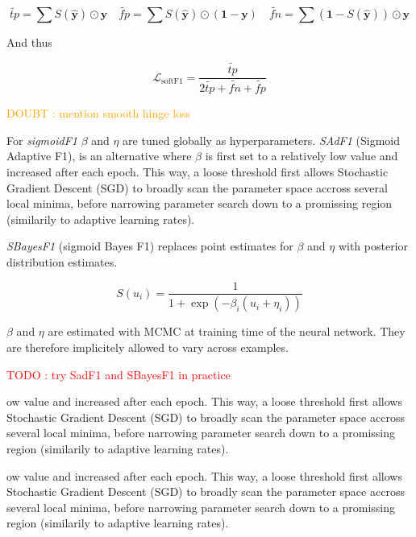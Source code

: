 \documentclass[sigconf,natbib,screen=true,review=true,anonymous]{acmart}
\newcommand\todo[1]{\textcolor{red}{TODO : #1}}
\newcommand\doubt[1]{\textcolor{orange}{DOUBT : #1}}
\begin{document}
$$
\widetilde{tp}=\sum S(\hat{\mathbf{y}}) \odot \mathbf{y} \quad\widetilde{fp}= \sum S(\hat{\mathbf{y}}) \odot (\mathbf{1} - \mathbf{y}) \quad \widetilde{f n}= \sum (\mathbf{1} - S(\hat{\mathbf{y}})) \odot \mathbf{y}
$$

And thus

\begin{equation}
\mathcal{L}_{\text {softF1}}= \frac{\widetilde{tp}}{2 \widetilde{tp}+ \widetilde{fn}+ \widetilde{fp}}
\end{equation}

\doubt{mention smooth hinge loss} \cite{smoothHinge}

For \emph{sigmoidF1} \(\beta\) and \(\eta\) are tuned globally as hyperparameters. \emph{SAdF1} (Sigmoid Adaptive F1), is an alternative where \(\beta\) is first set to a relatively low value and increased after each epoch. This way, a loose threshold first allows Stochastic Gradient Descent (SGD) to broadly scan the parameter space accross several local minima, before narrowing parameter search down to a promissing region (similarily to adaptive learning rates).

\emph{SBayesF1} (sigmoid Bayes F1) replaces point estimates for \(\beta\) and \(\eta\) with posterior distribution estimates. 

\begin{equation}
S(u_i) = \frac{1}{1+\exp (-\beta_i (u_i + \eta_i))}
\end{equation}



\(\beta\) and \(\eta\) are estimated with MCMC at training time of the neural network. They are therefore implicitely allowed to vary across examples.

\todo{try SadF1 and SBayesF1 in practice}

ow value and increased after each epoch. This way, a loose threshold first allows Stochastic Gradient Descent (SGD) to broadly scan the parameter space accross several local minima, before narrowing parameter search down to a promissing region (similarily to adaptive learning rates).

ow value and increased after each epoch. This way, a loose threshold first allows Stochastic Gradient Descent (SGD) to broadly scan the parameter space accross several local minima, before narrowing parameter search down to a promissing region (similarily to adaptive learning rates).
\end{document}

